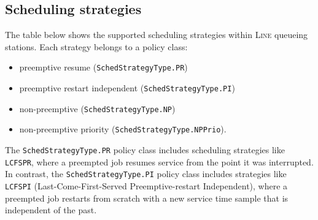 \subsection{Scheduling strategies}
The table below shows the supported scheduling strategies within \textsc{Line} queueing stations. Each strategy belongs to a policy class:
\begin{itemize}
\item preemptive resume (\texttt{SchedStrategyType.PR})%
\item preemptive restart independent (\texttt{SchedStrategyType.PI})
\item non-preemptive (\texttt{SchedStrategyType.NP})
\item non-preemptive priority (\texttt{SchedStrategyType.NPPrio}).
\end{itemize}

The \texttt{SchedStrategyType.PR} policy class includes scheduling strategies like \texttt{LCFSPR}, where a preempted job resumes service from the point it was interrupted. In contrast, the \texttt{SchedStrategyType.PI} policy class includes strategies like \texttt{LCFSPI} (Last-Come-First-Served Preemptive-restart Independent), where a preempted job restarts from scratch with a new service time sample that is independent of the past.

